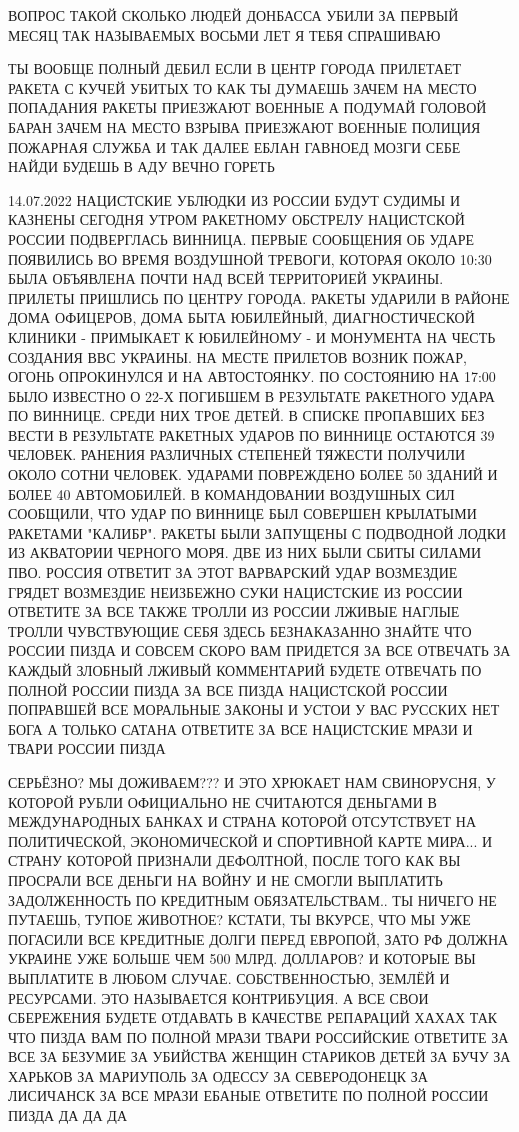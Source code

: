 ВОПРОС ТАКОЙ СКОЛЬКО ЛЮДЕЙ ДОНБАССА УБИЛИ ЗА ПЕРВЫЙ МЕСЯЦ ТАК НАЗЫВАЕМЫХ ВОСЬМИ
ЛЕТ Я ТЕБЯ СПРАШИВАЮ

ТЫ ВООБЩЕ ПОЛНЫЙ ДЕБИЛ ЕСЛИ В ЦЕНТР ГОРОДА ПРИЛЕТАЕТ РАКЕТА С КУЧЕЙ УБИТЫХ ТО
КАК ТЫ ДУМАЕШЬ ЗАЧЕМ НА МЕСТО ПОПАДАНИЯ РАКЕТЫ ПРИЕЗЖАЮТ ВОЕННЫЕ А ПОДУМАЙ
ГОЛОВОЙ БАРАН ЗАЧЕМ НА МЕСТО ВЗРЫВА ПРИЕЗЖАЮТ ВОЕННЫЕ ПОЛИЦИЯ ПОЖАРНАЯ СЛУЖБА И
ТАК ДАЛЕЕ ЕБЛАН ГАВНОЕД МОЗГИ СЕБЕ НАЙДИ БУДЕШЬ В АДУ ВЕЧНО ГОРЕТЬ

14.07.2022
НАЦИСТСКИЕ УБЛЮДКИ ИЗ РОССИИ БУДУТ СУДИМЫ И КАЗНЕНЫ СЕГОДНЯ УТРОМ РАКЕТНОМУ
ОБСТРЕЛУ НАЦИСТСКОЙ РОССИИ ПОДВЕРГЛАСЬ ВИННИЦА. ПЕРВЫЕ СООБЩЕНИЯ ОБ УДАРЕ
ПОЯВИЛИСЬ ВО ВРЕМЯ ВОЗДУШНОЙ ТРЕВОГИ, КОТОРАЯ ОКОЛО 10:30 БЫЛА ОБЪЯВЛЕНА ПОЧТИ
НАД ВСЕЙ ТЕРРИТОРИЕЙ УКРАИНЫ. ПРИЛЕТЫ ПРИШЛИСЬ ПО ЦЕНТРУ ГОРОДА. РАКЕТЫ УДАРИЛИ
В РАЙОНЕ ДОМА ОФИЦЕРОВ, ДОМА БЫТА ЮБИЛЕЙНЫЙ, ДИАГНОСТИЧЕСКОЙ КЛИНИКИ
- ПРИМЫКАЕТ К ЮБИЛЕЙНОМУ - И МОНУМЕНТА НА ЧЕСТЬ СОЗДАНИЯ ВВС УКРАИНЫ.  НА МЕСТЕ
ПРИЛЕТОВ ВОЗНИК ПОЖАР, ОГОНЬ ОПРОКИНУЛСЯ И НА АВТОСТОЯНКУ. ПО СОСТОЯНИЮ НА
17:00 БЫЛО ИЗВЕСТНО О 22-Х ПОГИБШЕМ В РЕЗУЛЬТАТЕ РАКЕТНОГО УДАРА ПО ВИННИЦЕ.
СРЕДИ НИХ ТРОЕ ДЕТЕЙ. В СПИСКЕ ПРОПАВШИХ БЕЗ ВЕСТИ В РЕЗУЛЬТАТЕ РАКЕТНЫХ УДАРОВ
ПО ВИННИЦЕ ОСТАЮТСЯ 39 ЧЕЛОВЕК. РАНЕНИЯ РАЗЛИЧНЫХ СТЕПЕНЕЙ ТЯЖЕСТИ ПОЛУЧИЛИ
ОКОЛО СОТНИ ЧЕЛОВЕК. УДАРАМИ ПОВРЕЖДЕНО БОЛЕЕ 50 ЗДАНИЙ И БОЛЕЕ 40 АВТОМОБИЛЕЙ.
В КОМАНДОВАНИИ ВОЗДУШНЫХ СИЛ СООБЩИЛИ, ЧТО УДАР ПО ВИННИЦЕ БЫЛ СОВЕРШЕН
КРЫЛАТЫМИ РАКЕТАМИ "КАЛИБР". РАКЕТЫ БЫЛИ ЗАПУЩЕНЫ С ПОДВОДНОЙ ЛОДКИ ИЗ
АКВАТОРИИ ЧЕРНОГО МОРЯ. ДВЕ ИЗ НИХ БЫЛИ СБИТЫ СИЛАМИ ПВО.  РОССИЯ ОТВЕТИТ ЗА
ЭТОТ ВАРВАРСКИЙ УДАР ВОЗМЕЗДИЕ ГРЯДЕТ ВОЗМЕЗДИЕ НЕИЗБЕЖНО СУКИ НАЦИСТСКИЕ ИЗ
РОССИИ ОТВЕТИТЕ ЗА ВСЕ ТАКЖЕ ТРОЛЛИ ИЗ РОССИИ ЛЖИВЫЕ НАГЛЫЕ ТРОЛЛИ ЧУВСТВУЮЩИЕ
СЕБЯ ЗДЕСЬ БЕЗНАКАЗАННО ЗНАЙТЕ ЧТО РОССИИ ПИЗДА И СОВСЕМ СКОРО ВАМ ПРИДЕТСЯ ЗА
ВСЕ ОТВЕЧАТЬ ЗА КАЖДЫЙ ЗЛОБНЫЙ ЛЖИВЫЙ КОММЕНТАРИЙ БУДЕТЕ ОТВЕЧАТЬ ПО ПОЛНОЙ
РОССИИ ПИЗДА ЗА ВСЕ ПИЗДА НАЦИСТСКОЙ РОССИИ ПОПРАВШЕЙ ВСЕ МОРАЛЬНЫЕ ЗАКОНЫ И
УСТОИ У ВАС РУССКИХ НЕТ БОГА А ТОЛЬКО САТАНА ОТВЕТИТЕ ЗА ВСЕ НАЦИСТСКИЕ МРАЗИ И
ТВАРИ РОССИИ ПИЗДА

СЕРЬЁЗНО? МЫ ДОЖИВАЕМ??? И ЭТО ХРЮКАЕТ НАМ СВИНОРУСНЯ, У КОТОРОЙ РУБЛИ
ОФИЦИАЛЬНО НЕ СЧИТАЮТСЯ ДЕНЬГАМИ В МЕЖДУНАРОДНЫХ БАНКАХ И СТРАНА КОТОРОЙ
ОТСУТСТВУЕТ НА ПОЛИТИЧЕСКОЙ, ЭКОНОМИЧЕСКОЙ И СПОРТИВНОЙ КАРТЕ МИРА... И СТРАНУ
КОТОРОЙ ПРИЗНАЛИ ДЕФОЛТНОЙ, ПОСЛЕ ТОГО КАК ВЫ ПРОСРАЛИ ВСЕ ДЕНЬГИ НА ВОЙНУ И НЕ
СМОГЛИ ВЫПЛАТИТЬ ЗАДОЛЖЕННОСТЬ ПО КРЕДИТНЫМ ОБЯЗАТЕЛЬСТВАМ.. ТЫ НИЧЕГО НЕ
ПУТАЕШЬ, ТУПОЕ ЖИВОТНОЕ? КСТАТИ, ТЫ ВКУРСЕ, ЧТО МЫ УЖЕ ПОГАСИЛИ ВСЕ КРЕДИТНЫЕ
ДОЛГИ ПЕРЕД ЕВРОПОЙ, ЗАТО РФ ДОЛЖНА УКРАИНЕ УЖЕ БОЛЬШЕ ЧЕМ 500 МЛРД. ДОЛЛАРОВ?
И КОТОРЫЕ ВЫ ВЫПЛАТИТЕ В ЛЮБОМ СЛУЧАЕ. СОБСТВЕННОСТЬЮ, ЗЕМЛЁЙ И РЕСУРСАМИ. ЭТО
НАЗЫВАЕТСЯ КОНТРИБУЦИЯ. А ВСЕ СВОИ СБЕРЕЖЕНИЯ БУДЕТЕ ОТДАВАТЬ В КАЧЕСТВЕ
РЕПАРАЦИЙ ХАХАХ ТАК ЧТО ПИЗДА ВАМ ПО ПОЛНОЙ МРАЗИ ТВАРИ РОССИЙСКИЕ ОТВЕТИТЕ ЗА ВСЕ
ЗА БЕЗУМИЕ ЗА УБИЙСТВА ЖЕНЩИН СТАРИКОВ ДЕТЕЙ ЗА БУЧУ ЗА ХАРЬКОВ ЗА МАРИУПОЛЬ
ЗА ОДЕССУ ЗА СЕВЕРОДОНЕЦК ЗА ЛИСИЧАНСК ЗА ВСЕ МРАЗИ ЕБАНЫЕ ОТВЕТИТЕ ПО ПОЛНОЙ
РОССИИ ПИЗДА ДА ДА ДА
